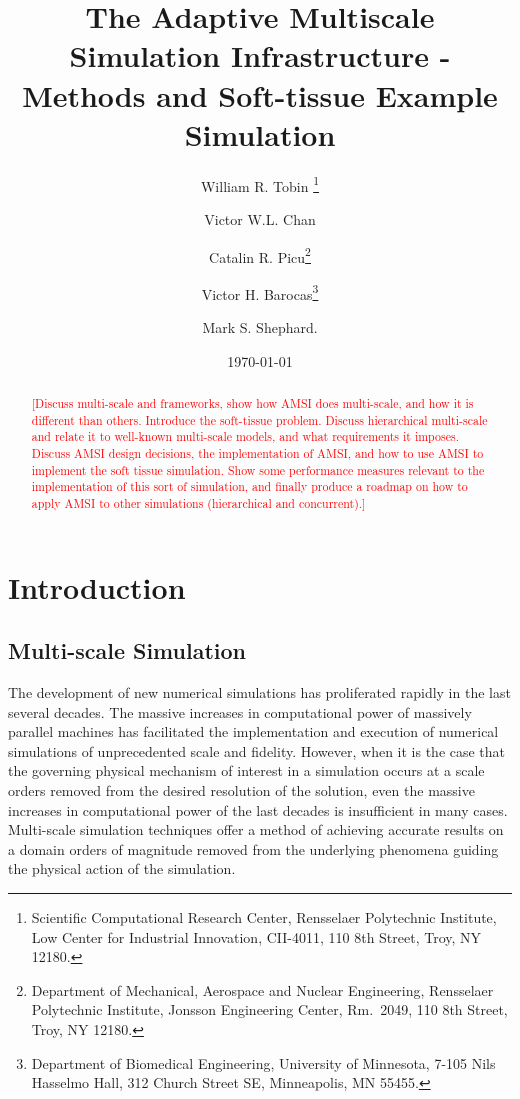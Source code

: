 \documentclass[review]{siamart1116}
\newcommand{\red}[1]{\textcolor{red}{[#1]}}
\begin{document}
\title{The Adaptive Multiscale Simulation Infrastructure - Methods and Soft-tissue Example Simulation}

\author{
  William R. Tobin \thanks{Scientific Computational Research Center, Rensselaer Polytechnic Institute, Low Center for Industrial Innovation, CII-4011, 110 8th Street, Troy, NY 12180.} 
  \and
  Victor W.L. Chan\footnotemark[1]
  \and
  Catalin R. Picu\footnotemark[1] \thanks{Department of Mechanical, Aerospace and Nuclear Engineering, Rensselaer Polytechnic Institute, Jonsson Engineering Center, Rm.\ 2049, 110 8th Street, Troy, NY 12180.}
  \and
  Victor H. Barocas\thanks{Department of Biomedical Engineering, University of Minnesota, 7-105 Nils Hasselmo Hall, 312 Church Street SE, Minneapolis, MN 55455.}
  \and
  Mark S. Shephard\footnotemark[1].
}
\date{\today}
\maketitle

\begin{abstract}
\red{Discuss multi-scale and frameworks, show how AMSI does multi-scale, and how it is different than others. Introduce the soft-tissue problem. Discuss hierarchical multi-scale and relate it to well-known multi-scale models, and what requirements it imposes. Discuss AMSI design decisions, the implementation of AMSI, and how to use AMSI to implement the soft tissue simulation. Show some performance measures relevant to the implementation of this sort of simulation, and finally produce a roadmap on how to apply AMSI to other simulations (hierarchical and concurrent).}

\end{abstract}

\section{Introduction}\label{sec:intro}

\subsection{Multi-scale Simulation}\label{sec:multiscale}

The development of new numerical simulations has proliferated rapidly in the last several decades. The massive increases in computational power of massively parallel machines has facilitated the implementation and execution of numerical simulations of unprecedented scale and fidelity. However, when it is the case that the governing physical mechanism of interest in a simulation occurs at a scale orders removed from the desired resolution of the solution, even the massive increases in computational power of the last decades is insufficient in many cases. Multi-scale simulation techniques offer a method of achieving accurate results on a domain orders of magnitude removed from the underlying phenomena guiding the physical action of the simulation.
\end{document}
